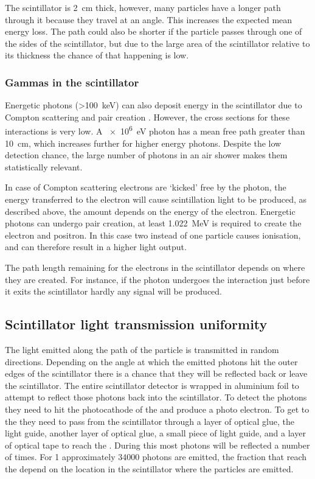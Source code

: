 The scintillator is \SI{2}{\centi\meter} thick, however, many particles have a longer path through it because they travel at an angle. This increases the expected mean energy loss. The path could also be shorter if the particle passes through one of the sides of the scintillator, but due to the large area of the scintillator relative to its thickness the chance of that happening is low.


\subsubsection{Gammas in the scintillator}

Energetic photons (\SI{>100}{\keV}) can also deposit energy in the scintillator due to Compton scattering and pair creation \cite{lio2015}. However, the cross sections for these interactions is very low. A \SI{e6}{\eV} photon has a mean free path greater than \SI{10}{\centi\meter}, which increases further for higher energy photons. Despite the low detection chance, the large number of photons in an air shower makes them statistically relevant.

In case of Compton scattering electrons are `kicked' free by the photon, the energy transferred to the electron will cause scintillation light to be produced, as described above, the amount depends on the energy of the electron. Energetic photons can undergo pair creation, at least \SI{1.022}{\MeV} is required to create the electron and positron. In this case two instead of one particle causes ionisation, and can therefore result in a higher light output.

The path length remaining for the electrons in the scintillator depends on where they are created. For instance, if the photon undergoes the interaction just before it exits the scintillator hardly any signal will be produced.


\subsection{Scintillator light transmission uniformity}

The light emitted along the path of the particle is transmitted in random directions. Depending on the angle at which the emitted photons hit the outer edges of the scintillator there is a chance that they will be reflected back or leave the scintillator. The entire scintillator detector is wrapped in aluminium foil to attempt to reflect those photons back into the scintillator. To detect the photons they need to hit the photocathode of the \pmt and produce a photo electron. To get to the \pmt they need to pass from the scintillator through a layer of optical glue, the light guide, another layer of optical glue, a small piece of light guide, and a layer of optical tape to reach the \pmt. During this most photons will be reflected a number of times. For \SI{1}{\mip} approximately \num{34000} photons \cite[sec. 3.1]{lio2010} are emitted, the fraction that reach the \pmt depend on the location in the scintillator where the particles are emitted.

